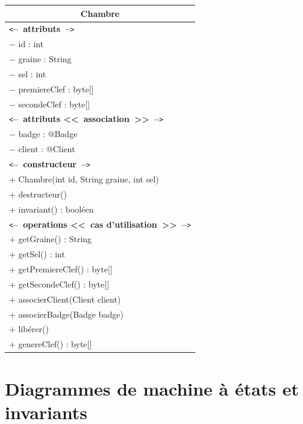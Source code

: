 \documentclass[11pt,article]{article}
\newcommand{\cmt}[1]{\texttt{<}\textbf{--~#1~--}\texttt{>}}
\begin{document}
\begin{center}
\begin{longtable}{|p{15cm}|}
\hline
\multicolumn{1}{|c|}{{\Large \textsf{Chambre}}} \\
\hline
\cmt{attributs}\\
$-$ id : int \\
$-$ graine : String \\
$-$ sel : int \\
$-$ premiereClef : byte[] \\
$-$ secondeClef : byte[] \\
\cmt{attributs <<~association~>>}\\
$-$ badge : @Badge \\
$-$ client : @Client \\
\hline
\cmt{constructeur} \\
$+$ Chambre(int id, String graine, int sel)\\
$+$ destructeur()\\
$+$ invariant() : booléen\\
\cmt{operations <<~cas d'utilisation~>>} \\
$+$ getGraine() : String \\
$+$ getSel() : int \\
$+$ getPremiereClef() : byte[] \\
$+$ getSecondeClef() : byte[] \\
$+$ associerClient(Client client) \\
$+$ associerBadge(Badge badge) \\
$+$ libérer() \\
$+$ genereClef() : byte[] \\
\hline
\end{longtable}
\end{center}
\newpage

\section{Diagrammes de machine à états et invariants}
\end{document}
